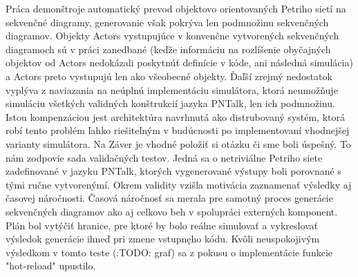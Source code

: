 Práca demonštroje automatický prevod objektovo orientovaných Petriho sietí na sekvenčné diagramy, generovanie však pokrýva len podmnožinu sekvenčných diagramov. Objekty Actors vystupujúce v konvenčne vytvorených sekvenčných diagramoch sú v práci zanedbané (keďže informáciu na rozlíšenie obyčajných objektov od Actors nedokázali poskytnúť definície v kóde, ani následná simulácia) a Actors preto vystupujú len ako všeobecné objekty. Ďaľší zrejmý nedostatok vyplýva z naviazania na neúplnú implementáciu simulátora, ktorá neumožňuje simuláciu všetkých validných konštrukcií jazyka PNTalk, len ich podmnožinu. Istou kompenzáciou jest architektúra navrhnutá ako distrubovaný systém, ktorá robí tento problém ľahko riešiteľným v budúcnosti po implementovaní vhodnejšej varianty simulátora. Na Záver je vhodné položiť si otázku či sme boli úspešný.
To nám zodpovie sada validačných testov. Jedná sa o netriviálne Petriho siete zadefinované v jazyku PNTalk, ktorých vygenerované výstupy boli porovnané s tými ručne vytvorenýmí. Okrem validity vzišla motivácia zaznamenať výsledky aj časovej náročnosti. Časová náročnosť sa merala pre samotný proces generácie sekvenčných diagramov ako aj celkovo beh v spolupráci externých komponent. Plán bol vytýčiť hranice, pre ktoré by bolo reálne simulovať a vykreslovať výsledok generácie ihneď pri zmene vstupnęho kódu. Kvôli neuspokojivým výsledkom v tomto teste (:TODO: graf) sa z pokusu o implementácie funkcie "hot-reload" upustilo. 





 

